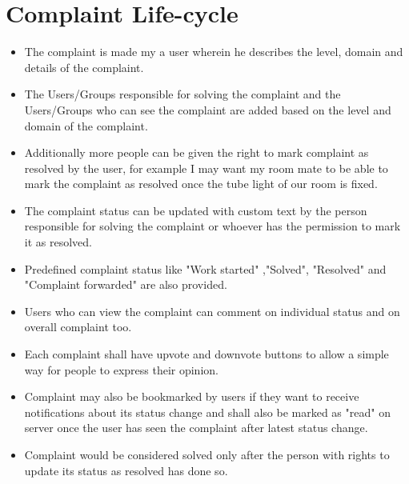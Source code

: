 \documentclass[12pt]{article}
\begin{document}
\section{Complaint Life-cycle}
\begin{itemize}
\setlength\itemsep{-0.4em}
\item The complaint is made my a user wherein he describes the level, domain and details of the complaint.
\item The Users/Groups responsible for solving the complaint and the Users/Groups who can see the complaint are added based on the level and domain of the complaint.
\item Additionally more people can be given the right to mark complaint as resolved by the user, for example I may want my room mate to be able to mark the complaint as resolved once the tube light of our room is fixed.
\item The complaint status can be updated with custom text by the person responsible for solving the complaint or whoever has the permission to mark it as resolved.
\item Predefined complaint status like "Work started" ,"Solved", "Resolved" and "Complaint forwarded" are also provided.
\item Users who can view the complaint can comment on individual status and on overall complaint too.
\item Each complaint shall have upvote and downvote buttons to allow a simple way for people to express their opinion.
\item Complaint may also be bookmarked by users if they want to receive notifications about its status change and shall also be marked as "read" on server once the user has seen the complaint after latest status change.
\item Complaint would be considered solved only after the person with rights to update its status as resolved has done so.
\end{itemize}
\end{document}
